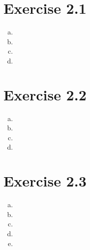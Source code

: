 \documentclass[a4paper]{article}
\begin{document}
\section*{Exercise 2.1}
\begin{enumerate}[(a)]
\item
\item
\item
\item
\end{enumerate}
\clearpage
\section*{Exercise 2.2}
\begin{enumerate}[(a)]
\item
\item
\item
\item
\end{enumerate}
\clearpage
\section*{Exercise 2.3}
\begin{enumerate}[(a)]
\item
\item
\item
\item
\item
\end{enumerate}
\clearpage
\end{document}

